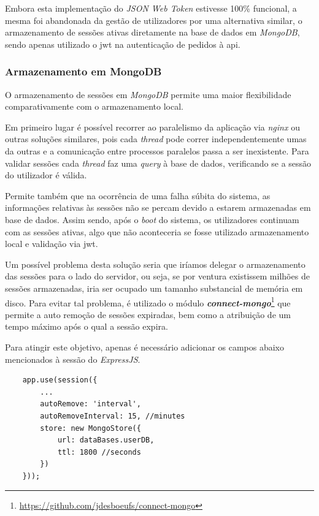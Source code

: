 Embora esta implementação do \emph{JSON Web Token} estivesse 100\% funcional, a mesma foi abandonada da gestão de utilizadores por uma alternativa similar, o armazenamento de sessões ativas diretamente na base de dados em \emph{MongoDB}, sendo apenas utilizado o \gls{jwt} na autenticação de pedidos à \gls{api}.

\cleardoublepage
\subsubsection{Armazenamento em MongoDB}

O armazenamento de sessões em \emph{MongoDB} permite uma maior flexibilidade comparativamente com o armazenamento local.

Em primeiro lugar é possível recorrer ao paralelismo da aplicação via \emph{nginx} ou outras soluções similares, pois cada \emph{thread} pode correr independentemente umas da outras e a comunicação entre processos paralelos passa a ser inexistente. Para validar sessões cada \emph{thread} faz uma \emph{query} à base de dados, verificando se a sessão do utilizador é válida.

Permite também que na ocorrência de uma falha súbita do sistema, as informações relativas às sessões não se percam devido a estarem armazenadas em base de dados. Assim sendo, após o \emph{boot} do sistema, os utilizadores continuam com as sessões ativas, algo que não aconteceria se fosse utilizado armazenamento local e validação via \gls{jwt}.

Um possível problema desta solução seria que iríamos delegar o armazenamento das sessões para o lado do servidor, ou seja, se por ventura existissem milhões de sessões armazenadas, iria ser ocupado um tamanho substancial de memória em disco. Para evitar tal problema, é utilizado o módulo \emph{\textbf{connect-mongo}}\footnote{\url{https://github.com/jdesboeufs/connect-mongo}} que permite a auto remoção de sessões expiradas, bem como a atribuição de um tempo máximo após o qual a sessão expira.

Para atingir este objetivo, apenas é necessário adicionar os campos abaixo mencionados à sessão do \emph{ExpressJS}.

\begin{verbatim}
    app.use(session({
        ...
        autoRemove: 'interval',
        autoRemoveInterval: 15, //minutes
        store: new MongoStore({
            url: dataBases.userDB,
            ttl: 1800 //seconds
        })
    }));
\end{verbatim}

